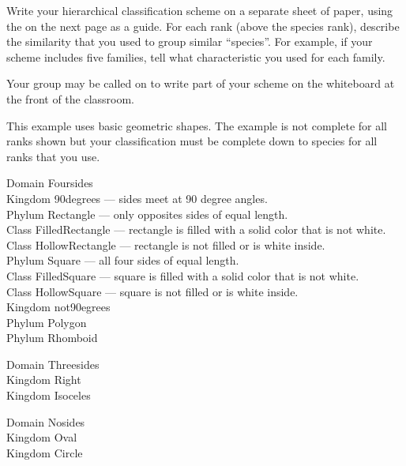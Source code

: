 \documentclass[12pt]{exam}
\newlength{\myindent}
\newcommand{\ind}{\hspace*{\myindent}}
\begin{document}
\begin{questions}

\question
Write your hierarchical classification scheme on a separate sheet of paper, using the on the next page as a guide. For each rank (above the species rank), describe the similarity that you used to group similar “species”. For example, if your scheme includes five families, tell what characteristic you used for each family.


Your group may be called on to write part of your scheme on the whiteboard at the front of the classroom.

\end{questions}

\newpage

This example uses basic geometric shapes. The example is not complete for all ranks shown but your classification must be complete down to species for all ranks that you use. \bigskip

Domain Foursides\\
	\ind Kingdom 90degrees — sides meet at 90 degree angles.\\
	\ind	\ind Phylum Rectangle — only opposites sides of equal length.\\
	\ind	\ind	\ind Class FilledRectangle — rectangle is filled with a solid color that is not white.\\
	\ind	\ind	\ind Class HollowRectangle  — rectangle is not filled or is white inside. \\
	\ind	\ind Phylum Square — all four sides of equal length.\\
	\ind	\ind	\ind Class FilledSquare — square is filled with a solid color that is not white.\\ 
	\ind	\ind	\ind Class HollowSquare — square is not filled or is white inside. \\
	\ind Kingdom not90egrees\\
	\ind	\ind Phylum Polygon\\
	\ind	\ind Phylum Rhomboid
	
	\medskip
	
Domain Threesides\\
	\ind Kingdom Right\\
	\ind Kingdom Isoceles
	
	\medskip
	
Domain Nosides\\
	\ind Kingdom Oval\\
	\ind Kingdom Circle\\
\end{document}
